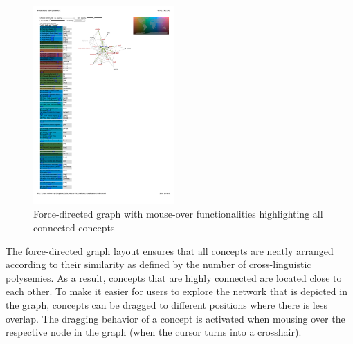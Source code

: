 \begin{figure}[htbp]
\begin{center}
\includegraphics[width=0.48\textwidth]{img/countryconnections}
\caption{Force-directed graph with mouse-over functionalities highlighting all connected concepts}
\label{EarthLand}
\end{center}
\end{figure}

The force-directed graph layout ensures that all concepts are neatly arranged according to their similarity as defined by the number of cross-linguistic polysemies. As a result, concepts that are highly connected are located close to each other.  To make it easier for users to explore the network that is depicted in the graph, concepts can be dragged to different positions where there is less overlap. The dragging behavior of a concept  is activated when mousing over the respective node in the graph (when the cursor turns into a crosshair).

